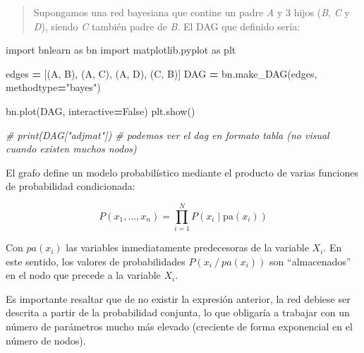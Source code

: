 \documentclass[
  a4paper,
  DIV=11,
  numbers=noendperiod]{scrreprt}
\newenvironment{Shaded}{\begin{snugshade}}{\end{snugshade}}
\newcommand{\CommentTok}[1]{\textcolor[rgb]{0.56,0.35,0.01}{\textit{#1}}}
\newcommand{\ImportTok}[1]{#1}
\newcommand{\NormalTok}[1]{#1}
\newcommand{\OperatorTok}[1]{\textcolor[rgb]{0.81,0.36,0.00}{\textbf{#1}}}
\newcommand{\StringTok}[1]{\textcolor[rgb]{0.31,0.60,0.02}{#1}}
\newcommand{\VariableTok}[1]{\textcolor[rgb]{0.00,0.00,0.00}{#1}}
\begin{document}
\begin{quote}
Supongamos una red bayesiana que contine un padre \emph{A} y 3 hijos
(\emph{B}, \emph{C} y \emph{D}), siendo \emph{C} también padre de
\emph{B}. El DAG que definido sería:
\end{quote}

\begin{Shaded}
\begin{Highlighting}[numbers=left,,]
\ImportTok{import}\NormalTok{ bnlearn }\ImportTok{as}\NormalTok{ bn}
\ImportTok{import}\NormalTok{ matplotlib.pyplot }\ImportTok{as}\NormalTok{ plt}

\NormalTok{edges }\OperatorTok{=}\NormalTok{ [(}\StringTok{\textquotesingle{}A\textquotesingle{}}\NormalTok{, }\StringTok{\textquotesingle{}B\textquotesingle{}}\NormalTok{), (}\StringTok{\textquotesingle{}A\textquotesingle{}}\NormalTok{, }\StringTok{\textquotesingle{}C\textquotesingle{}}\NormalTok{), (}\StringTok{\textquotesingle{}A\textquotesingle{}}\NormalTok{, }\StringTok{\textquotesingle{}D\textquotesingle{}}\NormalTok{), (}\StringTok{\textquotesingle{}C\textquotesingle{}}\NormalTok{, }\StringTok{\textquotesingle{}B\textquotesingle{}}\NormalTok{)]}
\NormalTok{DAG }\OperatorTok{=}\NormalTok{ bn.make\_DAG(edges, methodtype}\OperatorTok{=}\StringTok{"bayes"}\NormalTok{)}

\NormalTok{bn.plot(DAG, interactive}\OperatorTok{=}\VariableTok{False}\NormalTok{)}
\NormalTok{plt.show()}

\CommentTok{\# print(DAG["adjmat"])  \# podemos ver el dag en formato tabla (no visual cuando existen muchos nodos)}
\end{Highlighting}
\end{Shaded}

El grafo define un modelo probabilístico mediante el producto de varias
funciones de probabilidad condicionada:

\[P(x_1, \ldots, x_n) = \prod_{i=1}^{N} P(x_i \mid \text{pa}(x_i))\]

Con \(pa(x_i)\) las variables inmediatamente predecesoras de la variable
\(X_i\). En este sentido, los valores de probabilidades
\(P(x_i⁄pa(x_i ))\) son ``almacenados'' en el nodo que precede a la
variable \(X_i\).

Es importante resaltar que de no existir la expresión anterior, la red
debiese ser descrita a partir de la probabilidad conjunta, lo que
obligaría a trabajar con un número de parámetros mucho más elevado
(creciente de forma exponencial en el número de nodos).
\end{document}
